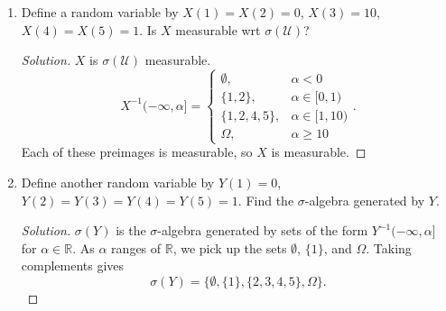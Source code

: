 \documentclass[11pt,letterpaper]{report}
\newcommand{\reals}{\mathbb{R}}
\newcommand{\mcal}[1]{\mathcal{#1}}
\newenvironment{solution}
{\begin{proof}[Solution]}
{\end{proof}}
\begin{document}
\begin{enumerate}
\begin{enumerate}
		\item Define a random variable by $X(1) = X(2) = 0$, $X(3) = 10$, $X(4) = X(5) = 1$. Is $X$ measurable wrt $\sigma(\mcal{U})$?
		\begin{solution}
			$X$ is $\sigma(\mcal{U})$ measurable.
			\[
			X^{-1}(-\infty, \alpha] = \begin{cases}
				\emptyset,&\alpha<0\\
				\{1, 2\},&\alpha\in[0,1)\\
				\{1,2,4,5\},&\alpha\in[1, 10)\\
				\Omega,&\alpha\geq 10
			\end{cases}.
			\]
			Each of these preimages is measurable, so $X$ is measurable.
		\end{solution}

		\item Define another random variable by $Y(1) = 0$, $Y(2) = Y(3) = Y(4) = Y(5) = 1$. Find the $\sigma$-algebra generated by $Y$.
		\begin{solution}
			$\sigma(Y)$ is the $\sigma$-algebra generated by sets of the form $Y^{-1}(-\infty, \alpha]$ for $\alpha\in \reals$. As $\alpha$ ranges of $\reals$, we pick up the sets $\emptyset$, $\{1\}$, and $\Omega$. Taking complements gives
			\[
			\sigma(Y) = \{\emptyset, \{1\}, \{2, 3,4, 5\}, \Omega\}.
			\]
		\end{solution}
	\end{enumerate}
\end{enumerate}
\end{document}
